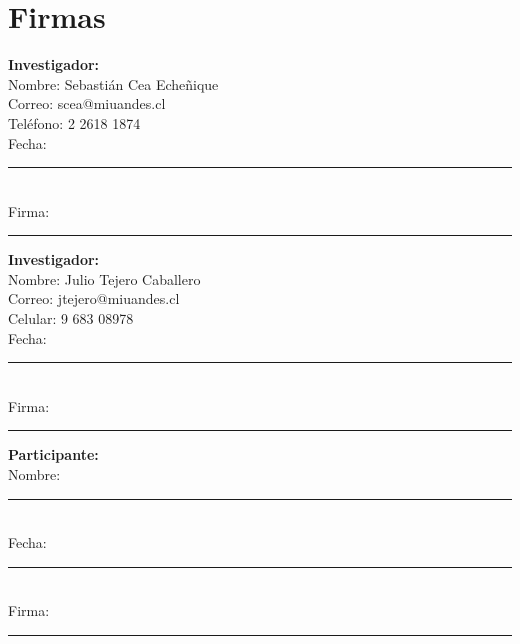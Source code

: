 \documentclass{article}
\begin{document}
\section*{Firmas}
\vspace{0.1\textwidth}
\begin{center}
\begin{minipage}{0.3\textwidth}
    \centering
    \textbf{Investigador:} \\
    Nombre: Sebastián Cea Echeñique\\
    Correo: scea@miuandes.cl \\
    Teléfono: 2 2618 1874 \\
    Fecha: \rule{0.6\textwidth}{0.4pt} \\
    Firma: \rule{0.6\textwidth}{0.4pt}
\end{minipage}%
\hspace{0.3\textwidth} %
\begin{minipage}{0.3\textwidth}
    \centering
    \textbf{Investigador:} \\
    Nombre: Julio Tejero Caballero \\
    Correo: jtejero@miuandes.cl \\
    Celular: 9 683 08978 \\
    Fecha: \rule{0.6\textwidth}{0.4pt} \\
    Firma: \rule{0.6\textwidth}{0.4pt}
\end{minipage}%
\vspace{0.2\textwidth}
\hspace{0.3\textwidth} %
\begin{minipage}{0.3\textwidth}
    \centering
    \textbf{Participante:} \\
    Nombre: \rule{0.8\textwidth}{0.4pt} \\
    Fecha: \rule{0.6\textwidth}{0.4pt} \\
    Firma: \rule{0.6\textwidth}{0.4pt}
\end{minipage}
\end{center}
\end{document}
